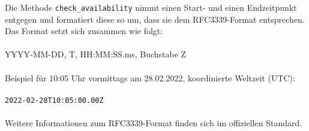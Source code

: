 
            
            Die Methode \verb|check_availability| nimmt einen Start- und einen Endzeitpunkt entgegen und formatiert diese so um, dass sie dem RFC3339-Format entsprechen. Das Format setzt sich zusammen wie folgt: \\
            \\
            YYYY-MM-DD, \glq T\grq, HH:MM:SS.ms, Buchstabe \glq Z\grq \\
            \\
            Beispiel für 10:05 Uhr vormittags am 28.02.2022, koordinierte Weltzeit (UTC): \\
            \\
            \verb/2022-02-28T10:05:00.00Z/ \\
            \\
            Weitere Informationen zum RFC3339-Format finden sich im offiziellen Standard. \cite{date_time} \\
            

